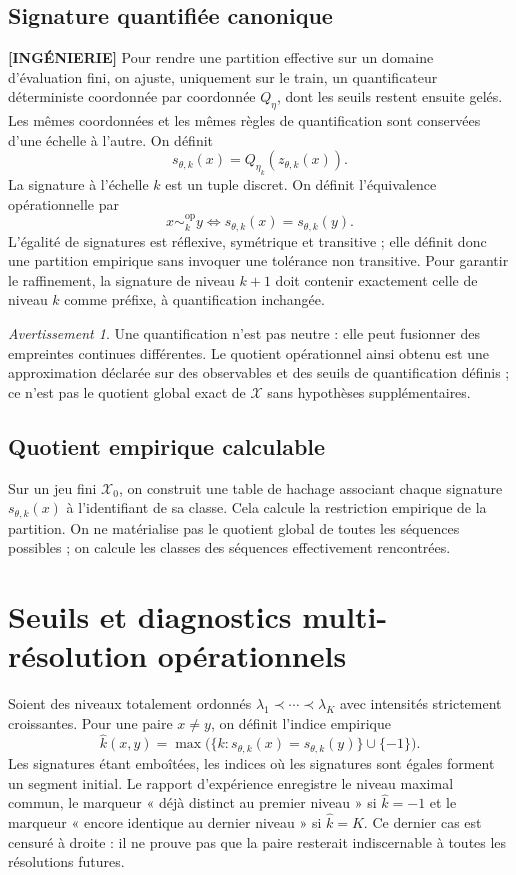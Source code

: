 \documentclass[11pt,a4paper]{article}
\theoremstyle{remark}
\newtheorem{warning}[definition]{Avertissement}
\newcommand{\X}{\mathcal X}
\begin{document}
\subsection{Signature quantifiée canonique}
\textbf{[INGÉNIERIE]} Pour rendre une partition effective sur un domaine d'évaluation fini, on ajuste, uniquement sur le train, un quantificateur déterministe coordonnée par coordonnée $Q_{\eta}$, dont les seuils restent ensuite gelés. Les mêmes coordonnées et les mêmes règles de quantification sont conservées d'une échelle à l'autre. On définit
\[
\boxed{s_{\theta,k}(x)=Q_{\eta_k}(z_{\theta,k}(x)).}
\]
La signature à l'échelle $k$ est un tuple discret. On définit l'équivalence opérationnelle par
\[
x\sim^{\mathrm{op}}_{k}y\iff s_{\theta,k}(x)=s_{\theta,k}(y).
\]
L'égalité de signatures est réflexive, symétrique et transitive ; elle définit donc une partition empirique sans invoquer une tolérance non transitive. Pour garantir le raffinement, la signature de niveau $k+1$ doit contenir exactement celle de niveau $k$ comme préfixe, à quantification inchangée.

\begin{warning}
Une quantification n'est pas neutre : elle peut fusionner des empreintes continues différentes. Le quotient opérationnel ainsi obtenu est une approximation déclarée sur des observables et des seuils de quantification définis ; ce n'est pas le quotient global exact de $\X$ sans hypothèses supplémentaires.
\end{warning}

\subsection{Quotient empirique calculable}
Sur un jeu fini $\X_0$, on construit une table de hachage associant chaque signature $s_{\theta,k}(x)$ à l'identifiant de sa classe. Cela calcule la restriction empirique de la partition. On ne matérialise pas le quotient global de toutes les séquences possibles ; on calcule les classes des séquences effectivement rencontrées.

\section{Seuils et diagnostics multi-résolution opérationnels}

Soient des niveaux totalement ordonnés $\lambda_1\prec\cdots\prec\lambda_K$ avec intensités strictement croissantes. Pour une paire $x\ne y$, on définit l'indice empirique
\[
\widehat k(x,y)=\max\big(\{k:s_{\theta,k}(x)=s_{\theta,k}(y)\}\cup\{-1\}\big).
\]
Les signatures étant emboîtées, les indices où les signatures sont égales forment un segment initial. Le rapport d'expérience enregistre le niveau maximal commun, le marqueur « déjà distinct au premier niveau » si $\widehat k=-1$ et le marqueur « encore identique au dernier niveau » si $\widehat k=K$. Ce dernier cas est censuré à droite : il ne prouve pas que la paire resterait indiscernable à toutes les résolutions futures.
\end{document}
